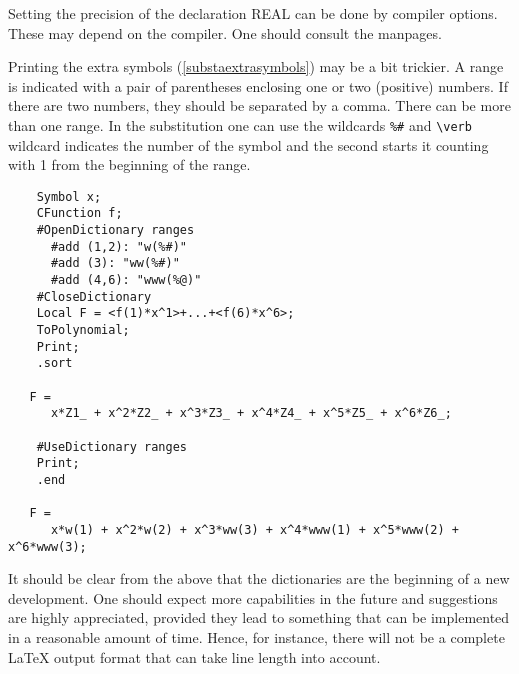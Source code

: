 Setting the precision of the declaration REAL can be done by 
compiler options. These may depend on the compiler. One should consult the 
manpages.

Printing the extra symbols (\ref{substaextrasymbols}) 
may be a bit trickier. A range is indicated with 
a pair of parentheses enclosing one or two (positive) numbers. If there are 
two numbers, they should be separated by a comma. There can be more than 
one range. In the substitution one can use the wildcards \verb:%#: and 
\verb:\verb:%
wildcard indicates the number of the symbol and the second starts it 
counting with 1 from the beginning of the range.
\begin{verbatim}
    Symbol x;
    CFunction f;
    #OpenDictionary ranges
      #add (1,2): "w(%#)"
      #add (3): "ww(%#)"
      #add (4,6): "www(%@)"
    #CloseDictionary
    Local F = <f(1)*x^1>+...+<f(6)*x^6>;
    ToPolynomial;
    Print;
    .sort

   F =
      x*Z1_ + x^2*Z2_ + x^3*Z3_ + x^4*Z4_ + x^5*Z5_ + x^6*Z6_;

    #UseDictionary ranges
    Print;
    .end

   F =
      x*w(1) + x^2*w(2) + x^3*ww(3) + x^4*www(1) + x^5*www(2) + x^6*www(3);
\end{verbatim}

It should be clear from the above that the dictionaries are the beginning 
of a new development. One should expect more capabilities in the future and 
suggestions are highly appreciated, provided they lead to something that 
can be implemented in a reasonable amount of time. Hence, for instance, 
there will not be a complete \LaTeX{} output format that can take line length 
into account.

